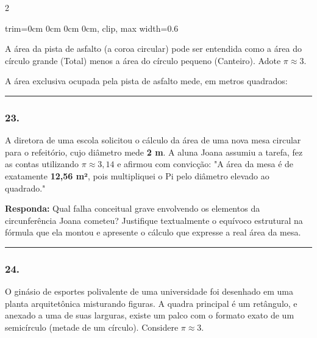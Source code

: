 \documentclass[twoside, 10pt, a4paper]{article}
\newlength{\espacoPreQuestao}\setlength{\espacoPreQuestao}{0.1cm}
\newlength{\espacoQuestao}\setlength{\espacoQuestao}{0.2cm}
\begin{document}
\begin{multicols*}{2}
\begin{center}
\begin{adjustbox}{trim=0cm 0cm 0cm 0cm, clip, max width=0.6\linewidth}
\end{adjustbox}
\end{center}

\begin{boxdica}
A área da pista de asfalto (a coroa circular) pode ser entendida como a área do círculo grande (Total) menos a área do círculo pequeno (Canteiro). Adote $ \pi \approx 3 $.
\end{boxdica}

A área exclusiva ocupada pela pista de asfalto mede, em metros quadrados:
\par\vspace{\espacoQuestao}

\noindent\textcolor{CorLinha}{\rule{\linewidth}{0.5pt}}
\par\vspace{\espacoPreQuestao}
\subsubsection*{23.} A diretora de uma escola solicitou o cálculo da área de uma nova mesa circular para o refeitório, cujo diâmetro mede \textbf{2 m}. A aluna Joana assumiu a tarefa, fez as contas utilizando $ \pi \approx 3,14 $ e afirmou com convicção: "A área da mesa é de exatamente \textbf{12,56 m²}, pois multipliquei o Pi pelo diâmetro elevado ao quadrado."
\begin{boxresponda}
\textbf{Responda:} Qual falha conceitual grave envolvendo os elementos da circunferência Joana cometeu? Justifique textualmente o equívoco estrutural na fórmula que ela montou e apresente o cálculo que expresse a real área da mesa.
\end{boxresponda}
\par\vspace{\espacoQuestao}

\noindent\textcolor{CorLinha}{\rule{\linewidth}{0.5pt}} 
\par\vspace{\espacoPreQuestao}
\subsubsection*{24.} O ginásio de esportes polivalente de uma universidade foi desenhado em uma planta arquitetônica misturando figuras. A quadra principal é um retângulo, e anexado a uma de suas larguras, existe um palco com o formato exato de um semicírculo (metade de um círculo). Considere $ \pi \approx 3 $.


\end{multicols*}
\end{document}
